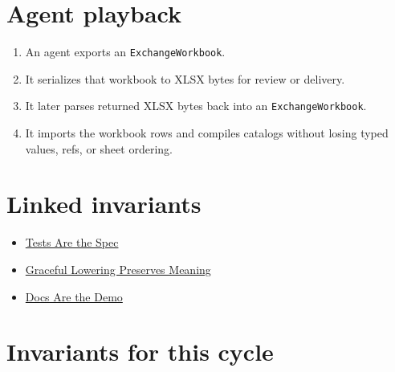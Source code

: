 \section{Agent playback}\label{record-193-agent-playback}

\begin{enumerate}
\def\labelenumi{\arabic{enumi}.}
\tightlist
\item
  An agent exports an \texttt{E\allowbreak{}x\allowbreak{}c\allowbreak{}h\allowbreak{}a\allowbreak{}n\allowbreak{}g\allowbreak{}e\allowbreak{}W\allowbreak{}o\allowbreak{}r\allowbreak{}k\allowbreak{}b\allowbreak{}o\allowbreak{}o\allowbreak{}k}.
\item
  It serializes that workbook to XLSX bytes for review or delivery.
\item
  It later parses returned XLSX bytes back into an \texttt{E\allowbreak{}x\allowbreak{}c\allowbreak{}h\allowbreak{}a\allowbreak{}n\allowbreak{}g\allowbreak{}e\allowbreak{}W\allowbreak{}o\allowbreak{}r\allowbreak{}k\allowbreak{}b\allowbreak{}o\allowbreak{}o\allowbreak{}k}.
\item
  It imports the workbook rows and compiles catalogs without losing typed values, refs, or sheet ordering.
\end{enumerate}

\section{Linked invariants}\label{record-193-linked-invariants}

\begin{itemize}
\tightlist
\item
  \href{https://github.com/flyingrobots/bijou/blob/cbd70612140e7a450d764b3c7be1c6af878b99bc/docs/invariants/tests-are-the-spec.md}{Tests Are the Spec}
\item
  \href{https://github.com/flyingrobots/bijou/blob/cbd70612140e7a450d764b3c7be1c6af878b99bc/docs/invariants/graceful-lowering-preserves-meaning.md}{Graceful Lowering Preserves Meaning}
\item
  \href{https://github.com/flyingrobots/bijou/blob/cbd70612140e7a450d764b3c7be1c6af878b99bc/docs/invariants/docs-are-the-demo.md}{Docs Are the Demo}
\end{itemize}

\section{Invariants for this cycle}\label{record-193-invariants-for-this-cycle}

